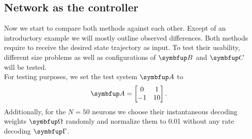 \subsection{Network as the controller}
Now we start to compare both methods against each other. Except of an introductory example we will mostly outline observed differences.
Both methods require to receive the desired state trajectory as input. To test their usability, different size problems as well as configurations of $\bmu{B}$ and $\bmu{C}$ will be tested.\\
For testing purposes, we set the test system $\bmu{A}$ to
\begin{equation}
	\bmu{A} = \begin{bmatrix}0 & 1\\-1 & 10\\\end{bmatrix}.
\end{equation}
Additionally, for the $N=50$ neurons we choose their instantaneous decoding weights $\bmu{\Omega}$ randomly and normalize them to 0.01 without any rate decoding $\bmu{\Gamma}$.

